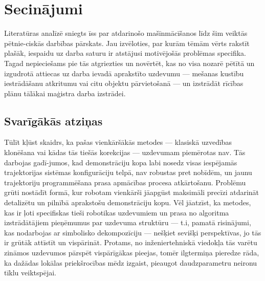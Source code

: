\documentclass[12pt, a4paper]{article}
\numberwithin{equation}{section} %
\begin{document}
%
%
%
%
%
%
%
%
%
%
%
%
%
%
%
%
%
%
%


\newpage
\section*{Secinājumi} %

Literatūras analīzē sniegts īss par atdarinošo mašīnmācīšanos līdz šim veiktās pētnie-ciskās darbības pārskats. Jau izvēloties, par kurām tēmām vērts rakstīt plašāk, iespaidu uz darba saturu ir atstājusi motivējošās problēmas specifika. Tagad nepieciešams pie tās atgriezties un novērtēt, kas no visa nozarē pētītā un izgudrotā attiecas uz darba ievadā aprakstīto uzdevumu --- mešanas kustību iestrādāšanu atkritumu vai citu objektu pārvietošanā --- un izstrādāt rīcības plānu tālākai maģistra darba izstrādei.

\subsection*{Svarīgākās atziņas}

Tūlīt kļūst skaidrs, ka pašas vienkāršākās metodes --- klasiskā uzvedības klonēšana \cite{pomerleau1989alvinn} vai kādas tās tiešās korekcijas --- uzdevumam piemērotas nav. Tās darbojas gadī-jumos, kad demonstrāciju kopa labi nosedz visas iespējamās trajektorijas sistēmas konfigurāciju telpā, nav robustas pret nobīdēm, un jaunu trajektoriju programmēšana prasa apmācības procesa atkārtošanu. Problēmu grūti nostādīt formā, kur robotam vienkārši jāapgūst maksimāli precīzi atdarināt detalizētu un pilnībā aprakstošu demonstrāciju kopu. Vēl jāatzīst, ka metodes, kas ir ļoti specifiskas tieši robotikas uzdevumiem un prasa no algoritma izstrādātājiem pieņēmumus par uzdevuma struktūru --- t.i, pamatā risinājumi, kas nodarbojas ar simbolisko dekompozīciju \cite{ijspeert2002movement,schaal2003computational, wang2020framework,pastor2011online,pastor2011skill} --- nešķiet sevišķi perspektīvas, jo tās ir grūtāk attīstīt un vispārināt. Protams, no inženiertehniskā viedokļa tās varētu zināmos uzdevumos pārspēt vispārīgākas pieejas, tomēr ilgtermiņa pieredze rāda, ka dažādas lokālas priekšrocības mēdz izgaist, pieaugot daudzparametru neironu tīklu veiktspējai.
\end{document}
